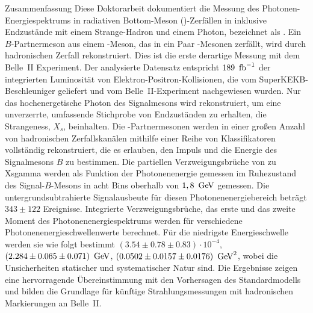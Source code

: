     \begin{abstractpage}{Zusammenfassung}
    Diese Doktorarbeit dokumentiert die Messung des Photonen-Energiespektrums in radiativen Bottom-Meson (\B)-Zerfällen 
    in inklusive Endzustände mit einem Strange-Hadron und einem Photon, bezeichnet als \BtoXsgamma. 
    Ein $B$-Partnermeson aus einem \FourS-Meson, das in ein Paar \B-Mesonen zerfällt, wird durch hadronischen Zerfall rekonstruiert.
    Dies ist die erste derartige Messung mit dem Belle~II Experiment.
    Der analysierte Datensatz entspricht $189~\mbox{\,fb}^{-1}$ der integrierten Luminosität von Elektron-Positron-Kollisionen, die vom SuperKEKB-Beschleuniger geliefert und vom Belle~II-Experiment nachgewiesen wurden.
    Nur das hochenergetische Photon des Signalmesons \B wird rekonstruiert, um eine unverzerrte, umfassende Stichprobe von Endzuständen zu erhalten, die Strangeness, $X_s$, beinhalten.
    Die \B-Partnermesonen werden in einer gro{\ss}en Anzahl von hadronischen Zerfallskanälen mithilfe einer Reihe von Klassifikatoren vollständig rekonstruiert,
    die es erlauben, den Impuls und die Energie des Signalmesons $B$ zu bestimmen.
    Die partiellen Verzweigungsbrüche von \B zu Xsgamma werden als Funktion der Photonenenergie gemessen 
    im Ruhezustand des Signal-$B$-Mesons in acht Bins oberhalb von $1,8~\mathrm{\,Ge\kern -0.1em V}$ gemessen.
    Die untergrundsubtrahierte Signalausbeute für diesen Photonenenergiebereich beträgt $343 \pm 122$ Ereignisse. 
    Integrierte Verzweigungsbrüche, das erste und das zweite Moment des Photonenenergiespektrums werden für verschiedene Photonenenergieschwellenwerte berechnet.
    Für die niedrigste Energieschwelle werden sie wie folgt bestimmt 
    $(3.54 \pm 0.78 \pm 0.83)\cdot10^{-4}$,
    $(2.284 \pm 0.065 \pm 0.071)~\mathrm{\,Ge\kern -0.1em V}$,
    $(0.0502 \pm 0.0157 \pm 0.0176)~\mathrm{\,Ge\kern -0.1em V}^2$,
    wobei die Unsicherheiten statischer und systematischer Natur sind.
    Die Ergebnisse zeigen eine hervorragende Übereinstimmung mit den Vorhersagen des Standardmodells und bilden die Grundlage für künftige Strahlungsmessungen mit hadronischen Markierungen an Belle~II.
    \end{abstractpage}
    